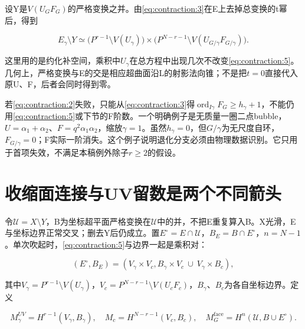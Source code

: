 \documentclass[11pt,a4paper,oneside]{ctexrep}
\theoremstyle{cnplain}
\theoremstyle{definition}
\theoremstyle{remark}
\begin{document}
设Y是\(V(U_G F_G)\)的严格变换之并。由\eqref{eq:contraction:3}在E上去掉总变换的t幂后，得到

\begin{equation}
E_\gamma\setminus Y
  \simeq\big(P^{r-1}\setminus V(U_\gamma)\big)
       \times\big(P^{N-r-1}\setminus V(U_{G/\gamma}F_{G/\gamma})\big).
                                                                    \label{eq:contraction:5}
\end{equation}

这里用的是约化补空间，乘积中\(U_\gamma \)在总方程中出现几次不改变\eqref{eq:contraction:5}。几何上，严格变换与E的交是相应超曲面沿L的射影法向锥；不是把\(t=0\)直接代入原U、F，后者会同时得到零。

若\eqref{eq:contraction:2}失败，只能从\eqref{eq:contraction:3}得\(\operatorname{ord}_{I\gamma }F_G\ge h_\gamma +1\)，不能仍用\eqref{eq:contraction:5}或下节的F阶数。一个明确例子是无质量一圈二点bubble，\(U=\alpha _1+\alpha _2\)、\(F=q^{2}\alpha _1\alpha _2\)，缩放\(\gamma ={1}\)。虽然\(h_\gamma =0\)，但\(G/\gamma \)为无尺度自环，\(F_{G/\gamma }=0\)；F实际一阶消失。这个例子说明退化分支必须由物理数据识别。它只用于首项失效，不满足本稿例外除子\(r\ge 2\)的假设。

\section{收缩面连接与UV留数是两个不同箭头}\label{sec:contraction:3}

令\(\mathcal U=X\setminus Y\)，B为坐标超平面严格变换在\(\mathcal U\)中的并，不把E重复算入B。X光滑，E与坐标边界正常交叉；删去Y后仍成立。置\(E^\circ=E\cap \)\(\mathcal U\)，\(B_E=B\cap E^\circ\)，\(n=N- 1\)。单次吹起时，\eqref{eq:contraction:5}与边界一起是乘积对：

\begin{equation}
(E^\circ,B_E)=(V_\gamma\times V_c,
                    B_\gamma\times V_c\ \cup\ V_\gamma\times B_c),            \label{eq:contraction:6}
\end{equation}

其中\(V_\gamma =P^{r- 1}\setminus V(U_\gamma )\)，\(V_c=P^{N- r- 1}\setminus V(U_c F_c)\)，\(B_\gamma \)、\(B_c\)为各自坐标边界。定义

\begin{equation}
M_\gamma^{UV}=H^{r-1}(V_\gamma,B_\gamma),\quad
 M_c=H^{N-r-1}(V_c,B_c),\quad
 M_G^{\mathrm{face}}=H^n(\mathcal U,B\cup E^\circ).                \label{eq:contraction:7}
\end{equation}
\end{document}
